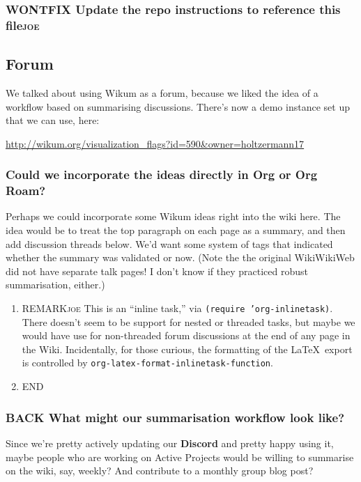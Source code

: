\documentclass[11pt]{article}
\begin{document}
\subsubsection{{\bfseries\sffamily WONTFIX} Update the repo instructions to reference this file\hfill{}\textsc{joe}}
\label{sec:org6639b4b}

\subsection{Forum}
\label{sec:orgb61a99d}
We talked about using Wikum as a forum, because we liked the idea of a
workflow based on summarising discussions. There’s now a demo instance
set up that we can use, here:

\url{http://wikum.org/visualization\_flags?id=590\&owner=holtzermann17}

\subsubsection{Could we incorporate the ideas directly in Org or Org Roam?}
\label{sec:org72b7a37}

Perhaps we could incorporate some Wikum ideas right into the wiki
here.  The idea would be to treat the top paragraph on each page as a
summary, and then add discussion threads below.  We’d want some system
of tags that indicated whether the summary was validated or now.
(Note the the original WikiWikiWeb did not have separate talk pages!
I don’t know if they practiced robust summarisation, either.)

\begin{enumerate}
\item REMARK\hfill{}\textsc{joe}
\label{sec:org627f701}
This is an “inline task,” via \texttt{(require 'org-inlinetask)}.  There
doesn’t seem to be support for nested or threaded tasks, but maybe we
would have use for non-threaded forum discussions at the end of any
page in the Wiki.  Incidentally, for those curious, the formatting of
the \LaTeX~export is controlled by
\texttt{org-latex-format-inlinetask-function}.
\item END
\label{sec:org9557007}
\end{enumerate}

\subsubsection{{\bfseries\sffamily BACK} What might our summarisation workflow look like?}
\label{sec:org08e07fc}
Since we’re pretty actively updating our \textbf{Discord} and pretty happy
using it, maybe people who are working on Active Projects would be
willing to summarise on the wiki, say, weekly?  And contribute to a
monthly group blog post?
\end{document}
